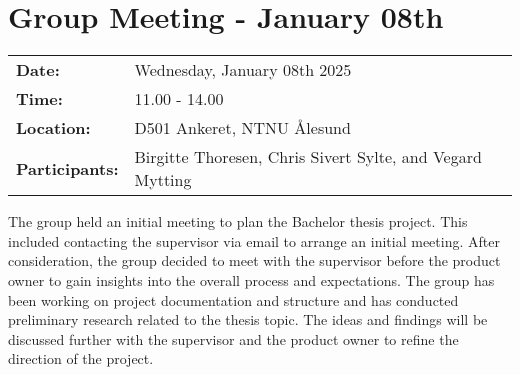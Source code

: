 \section{Group Meeting - January 08th}
\begin{tabular}{ll}
    \textbf{Date:} & Wednesday, January 08th 2025 \\
    \textbf{Time:} & 11.00 - 14.00\\
    \textbf{Location:} & D501 Ankeret, NTNU Ålesund \\
    \textbf{Participants:} & Birgitte Thoresen, Chris Sivert Sylte, and Vegard Mytting\\
\end{tabular}

\vspace{0.5cm}

The group held an initial meeting to plan the Bachelor thesis project. This included contacting the supervisor via email to arrange an initial meeting. After consideration, the group decided to meet with the supervisor before the product owner to gain insights into the overall process and expectations. The group has been working on project documentation and structure and has conducted preliminary research related to the thesis topic. The ideas and findings will be discussed further with the supervisor and the product owner to refine the direction of the project. \cite{ntnuopen:21}